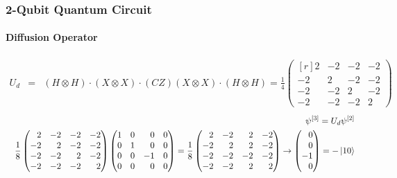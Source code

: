 \begin{frame}
	\frametitle{2-Qubit Quantum Circuit}
	\framesubtitle{Diffusion Operator}
	
	\begin{eqnarray*}
		U_d & = & \left(H\otimes H\right) \cdot \left(X\otimes X\right)\cdot \left(CZ\right) \left(X\otimes X\right) \cdot \left(H \otimes H \right) =  \frac{1}{4}
		\begin{pmatrix*}[r]
			2 & -2 & -2 & -2 \\
			-2 & 2 & -2 & -2 \\
			-2 & -2 & 2 & -2 \\
			-2 & -2 & -2 & 2
		\end{pmatrix*}
	\end{eqnarray*}
	\begin{eqnarray}
		&& \psi^{[3]} = U_d\psi^{[2]}\nonumber\\
		           &&\frac{1}{8}
		           \begin{pmatrix*}[r]
		           2 & -2 & -2 & -2 \\
		           -2 & 2 & -2 & -2 \\
		           -2 & -2 & 2 & -2 \\
		           -2 & -2 & -2 & 2
		           \end{pmatrix*}
		           \begin{pmatrix*}[r]
		           1 & 0 & 0 & 0 \\
		           0 & 1 & 0 & 0 \\
		           0 & 0 & -1 & 0 \\
		           0 & 0 & 0 & 0
		           \end{pmatrix*}=\frac{1}{8}
		           \begin{pmatrix*}[r]
		           2 & -2 & 2 & -2 \\
		           -2 & 2 & 2 & -2 \\
		           -2& -2 & -2 & -2 \\
		           -2 & -2 & 2 & 2
		           \end{pmatrix*}\rightarrow
		           \begin{pmatrix*}[r]
		           0\\
		           0 \\
		           -1\\
		           0
		           \end{pmatrix*} = -\ket{10}\nonumber
	\end{eqnarray}
		
\end{frame}
			